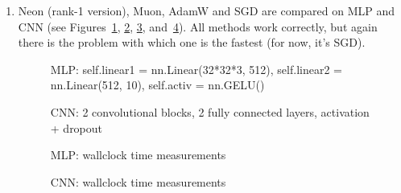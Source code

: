 \documentclass[]{scrartcl}
\begin{document}
\begin{enumerate}
    \item Neon (rank-1 version), Muon, AdamW and SGD are compared on MLP and CNN (see Figures~\ref{fig:mlp_epochs}, \ref{fig:cnn_epochs}, \ref{fig:mlp_time}, and~\ref{fig:cnn_time}). All methods work correctly, but again there is the problem with which one is the fastest (for now, it's SGD).
    \begin{figure}[h!]
        \caption{MLP: self.linear1 = nn.Linear(32*32*3, 512), self.linear2 = nn.Linear(512, 10), self.activ = nn.GELU()}
        \label{fig:mlp_epochs}
    \end{figure}
    \begin{figure}[h!]
        \caption{CNN: 2 convolutional blocks, 2 fully connected layers, activation + dropout}
        \label{fig:cnn_epochs}
    \end{figure}
    \begin{figure}[h!]
        \caption{MLP: wallclock time measurements}
        \label{fig:mlp_time}
    \end{figure}
    \begin{figure}[h!]
        \caption{CNN: wallclock time measurements}
        \label{fig:cnn_time}
    \end{figure}
\end{enumerate}\\





\end{document}
